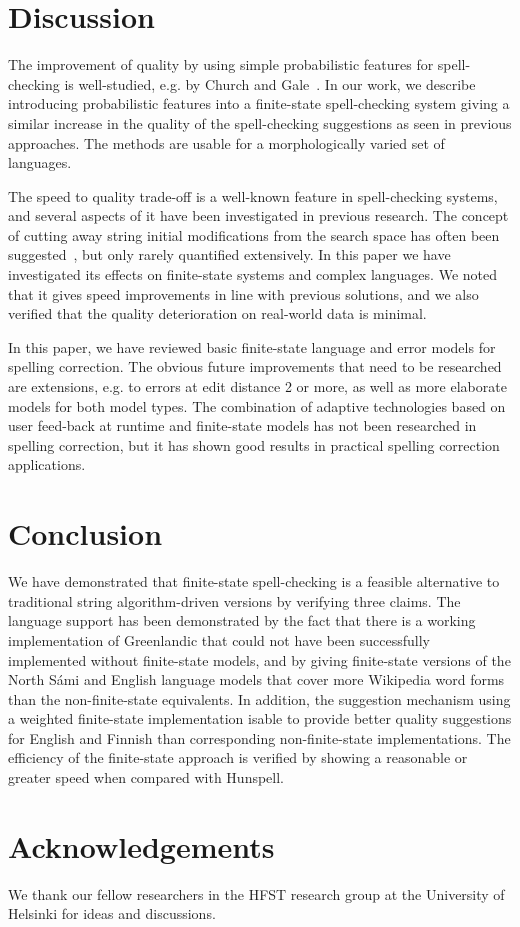 \documentclass[postprint]{flammie}
\begin{document}
\section{Discussion}

The improvement of quality by using simple probabilistic features for
spell-checking is well-studied, e.g. by Church and
Gale~\cite{church1991probability}. In our work, we describe introducing
probabilistic features into a finite-state spell-checking system giving a
similar increase in the quality of the spell-checking suggestions as seen in
previous approaches.  The methods are usable for a morphologically varied set
of languages.

The speed to quality trade-off is a well-known feature in spell-checking
systems, and several aspects of it have been investigated in previous research.
The concept of cutting away string initial modifications from the search space
has often been suggested~\cite{bhagat2007spelling,kukich1992techniques}, but
only rarely quantified extensively. In this paper we have investigated its
effects on finite-state systems and complex languages. We noted that it gives
speed improvements in line with previous solutions, and we also verified that
the quality deterioration on real-world data is minimal.

In this paper, we have reviewed basic finite-state language and error models
for spelling correction. The obvious future improvements that need to be
researched are extensions, e.g. to errors at edit distance 2 or more, as well
as more elaborate models for both model types. The combination of adaptive
technologies based on user feed-back at runtime and finite-state models has
not been researched in spelling correction, but it has shown good results in
practical spelling correction applications.

\section{Conclusion}

We have demonstrated that finite-state spell-checking is a feasible alternative
to traditional string algorithm-driven versions by verifying three claims.
The language support has been demonstrated by the fact that there is a
working implementation of Greenlandic that could not have been successfully
implemented without finite-state models, and by giving finite-state versions of
the North Sámi and English language models that cover more Wikipedia word forms
than the non-finite-state equivalents.  In addition, the suggestion mechanism
using a weighted finite-state implementation isable to provide better quality
suggestions for English and Finnish than corresponding non-finite-state
implementations. The efficiency of the finite-state approach is verified by
showing a reasonable or greater speed when compared with Hunspell.

\section*{Acknowledgements}

We thank our fellow researchers in the HFST research group at the University of
Helsinki for ideas and discussions.



\end{document}
